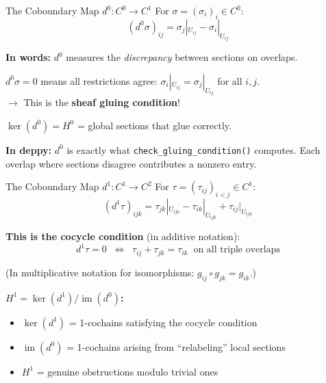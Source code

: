 \documentclass[aspectratio=169,10pt]{beamer}
\newcommand{\im}{\operatorname{im}}
\begin{document}
\begin{frame}{The Coboundary Map $d^0 : C^0 \to C^1$}
For $\sigma = (\sigma_i)_{i} \in C^0$:
\[
(d^0 \sigma)_{ij} = \sigma_j|_{U_{ij}} - \sigma_i|_{U_{ij}}
\]

\textbf{In words:} $d^0$ measures the \emph{discrepancy} between sections on overlaps.

\vspace{0.3em}
\textbf{$d^0 \sigma = 0$} means all restrictions agree: $\sigma_i|_{U_{ij}} = \sigma_j|_{U_{ij}}$ for all $i, j$.\\
$\to$ This is the \textbf{sheaf gluing condition}!

\vspace{0.3em}
$\ker(d^0) = H^0$ = global sections that glue correctly.

\vspace{0.3em}
\textbf{In deppy:} $d^0$ is exactly what \texttt{check\_gluing\_condition()} computes. Each overlap where sections disagree contributes a nonzero entry.
\end{frame}

\begin{frame}{The Coboundary Map $d^1 : C^1 \to C^2$}
For $\tau = (\tau_{ij})_{i<j} \in C^1$:
\[
(d^1 \tau)_{ijk} = \tau_{jk}|_{U_{ijk}} - \tau_{ik}|_{U_{ijk}} + \tau_{ij}|_{U_{ijk}}
\]

\textbf{This is the cocycle condition} (in additive notation):
\[
d^1 \tau = 0 \;\;\Leftrightarrow\;\; \tau_{ij} + \tau_{jk} = \tau_{ik} \;\;\text{on all triple overlaps}
\]

(In multiplicative notation for isomorphisms: $g_{ij} \circ g_{jk} = g_{ik}$.)

\vspace{0.3em}
\textbf{$H^1 = \ker(d^1) / \im(d^0)$:}
\begin{itemize}
  \item $\ker(d^1)$ = 1-cochains satisfying the cocycle condition
  \item $\im(d^0)$ = 1-cochains arising from ``relabeling'' local sections
  \item $H^1$ = genuine obstructions modulo trivial ones
\end{itemize}
\end{frame}
\end{document}
